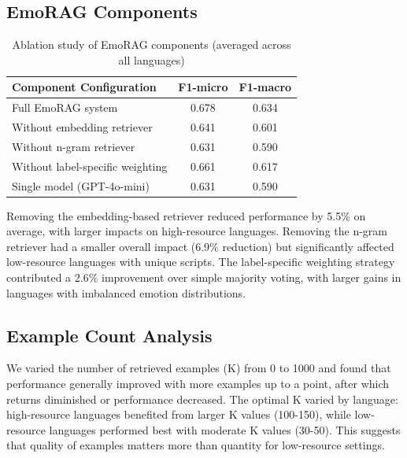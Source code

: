 \documentclass[a4paper,12pt]{extarticle}
\begin{document}
\subsection{EmoRAG Components}

\begin{table}[h]
\centering
\begin{tabular}{lcc}
\toprule
\textbf{Component Configuration} & \textbf{F1-micro} & \textbf{F1-macro} \\
\midrule
Full EmoRAG system & 0.678 & 0.634 \\
Without embedding retriever & 0.641 & 0.601 \\
Without n-gram retriever & 0.631 & 0.590 \\
Without label-specific weighting & 0.661 & 0.617 \\
Single model (GPT-4o-mini) & 0.631 & 0.590 \\
\bottomrule
\end{tabular}
\caption{Ablation study of EmoRAG components (averaged across all languages)}
\label{tab:ablation_components}
\end{table}

Removing the embedding-based retriever reduced performance by 5.5\% on average, with larger impacts on high-resource languages. Removing the n-gram retriever had a smaller overall impact (6.9\% reduction) but significantly affected low-resource languages with unique scripts. The label-specific weighting strategy contributed a 2.6\% improvement over simple majority voting, with larger gains in languages with imbalanced emotion distributions.

\subsection{Example Count Analysis}


We varied the number of retrieved examples (K) from 0 to 1000 and found that performance generally improved with more examples up to a point, after which returns diminished or performance decreased. The optimal K varied by language: high-resource languages benefited from larger K values (100-150), while low-resource languages performed best with moderate K values (30-50). This suggests that quality of examples matters more than quantity for low-resource settings.
\end{document}
